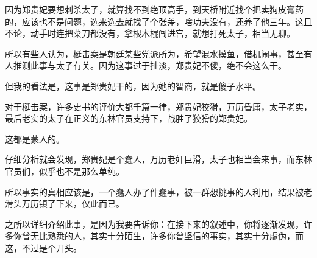 \begin{multicols}{\theparacolNo}
因为郑贵妃要想刺杀太子，就算找不到绝顶高手，到天桥附近找个把卖狗皮膏药的，应该也不是问题，选来选去就找了个张差，啥功夫没有，还养了他三年。这且不论，动手时连把菜刀都没有，拿根木棍闯进宫，就想打死太子，相当无聊。

所以有些人认为，梃击案是朝廷某些党派所为，希望混水摸鱼，借机闹事，甚至有人推测此事与太子有关。因为这事过于扯淡，郑贵妃不傻，绝不会这么干。

但我的看法是，这事是郑贵妃干的，因为她的智商，就是傻子水平。

对于梃击案，许多史书的评价大都千篇一律，郑贵妃狡猾，万历昏庸，太子老实，最后老实的太子在正义的东林官员支持下，战胜了狡猾的郑贵妃。

这都是蒙人的。

仔细分析就会发现，郑贵妃是个蠢人，万历老奸巨滑，太子也相当会来事，而东林官员们，似乎也不是那么单纯。

所以事实的真相应该是，一个蠢人办了件蠢事，被一群想挑事的人利用，结果被老滑头万历镇了下来，仅此而已。

之所以详细介绍此事，是因为我要告诉你：在接下来的叙述中，你将逐渐发现，许多你曾无比熟悉的人，其实十分陌生，许多你曾坚信的事实，其实十分虚伪，而这，不过是个开头。

\ifnum{}
	\end{multicols}
\fi
\newpage
